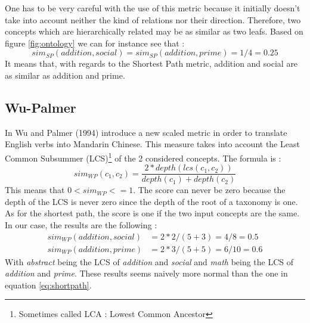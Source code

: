 One has to be very careful with the use of this metric because it initially doesn't take into account neither the kind of relations nor their direction. Therefore, two concepts which are hierarchically related may be as similar as two leafs. Based on figure \ref{fig:ontology} we can for instance see that :
\begin{equation}
\label{eq:shortpath}
sim_{SP}(addition, social) = sim_{SP}(addition, prime) = 1/4 = 0.25
\end{equation}
It means that, with regards to the Shortest Path metric, addition and social are as similar as addition and prime.

\subsection{Wu-Palmer} %
\label{ssub:wu_palmer}
In \cite{wu1994verbs} Wu and Palmer (1994) introduce a new scaled metric in order to translate English verbs into Mandarin Chinese. This measure takes into account the Least Common Subsummer (LCS)\footnote{Sometimes called LCA : Lowest Common Ancestor} of the 2 considered concepts. The formula is :
\begin{equation}
\label{eq:wupalmer}
sim_{WP}(c_1, c_2) = \frac{2*depth(lcs(c_1,c_2))}{depth(c_1) + depth(c_2)}
\end{equation}
This means that $0 < sim_{WP} <= 1$. The score can never be zero because the depth of the LCS is never zero since the depth of the root of a taxonomy is one. As for the shortest path, the score is one if the two input concepts are the same.\\
In our case, the results are the following :
\begin{align}
\label{eq:resultsWP}
sim_{WP}(addition, social)& = 2*2 / (5 + 3) = 4/8 = 0.5\\
sim_{WP}(addition, prime)& = 2*3 / (5 + 5) = 6/10 = 0.6
\end{align}
With \textit{abstract} being the LCS of \textit{addition} and \textit{social} and \textit{math} being the LCS of \textit{addition} and \textit{prime}. These results seems naively more normal than the one in equation \eqref{eq:shortpath}.\\

